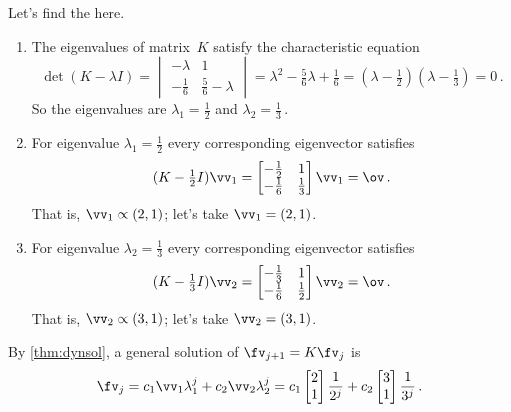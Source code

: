 \begin{example}
\begin{solution}
\begin{enumerate}[ref=\ref{eg:2expfit}(\alph*)]
Let's find the  here.
\begin{enumerate}
\item The eigenvalues of matrix~\(K\) satisfy the characteristic equation
\begin{equation*}
\det(K-\lambda I)=\begin{vmatrix} -\lambda&1\\-\frac16& \frac56-\lambda\end{vmatrix}
=\lambda^2-\tfrac56\lambda+\tfrac16
=(\lambda-\tfrac12)(\lambda-\tfrac13)
=0\,.
\end{equation*}
So the eigenvalues are \(\lambda_1=\tfrac12\) and \(\lambda_2=\tfrac13\)\,.
\item For eigenvalue \(\lambda_1=\tfrac12\) every corresponding eigenvector satisfies
\begin{equation*}
(K-\tfrac12I)\vv_1=\begin{bmatrix} -\frac12&1\\-\frac16&\frac13 \end{bmatrix}\vv_1=\ov\,.
\end{equation*}
That is, \(\vv_1\propto (2,1)\); let's take \(\vv_1=(2,1)\).
\item For eigenvalue \(\lambda_2=\tfrac13\) every corresponding eigenvector satisfies
\begin{equation*}
(K-\tfrac13I)\vv_2=\begin{bmatrix} -\frac13&1\\-\frac16&\frac12 \end{bmatrix}\vv_2=\ov\,.
\end{equation*}
That is, \(\vv_2\propto (3,1)\); let's take \(\vv_2=(3,1)\).
\end{enumerate}
By \cref{thm:dynsol}, a general solution of \(\fv_{j+1}=K\fv_j\) is 
\begin{equation*}
\fv_j=c_1\vv_1\lambda_1^j+c_2\vv_2\lambda_2^j
=c_1\begin{bmatrix} 2\\1 \end{bmatrix}\frac1{2^j} +c_2\begin{bmatrix} 3\\1 \end{bmatrix}\frac1{3^j}\,.
\end{equation*}



\end{enumerate}
\end{solution}
\end{example}
